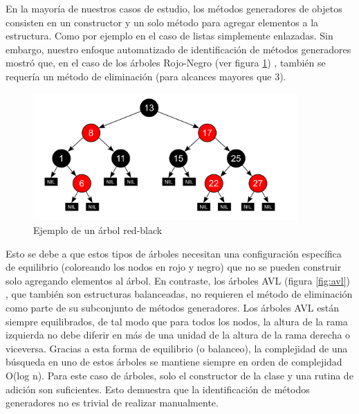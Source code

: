En la mayoría de nuestros casos de estudio, los métodos generadores de objetos consisten en un constructor y un solo método para agregar elementos a la estructura. 
Como por ejemplo en el caso de listas simplemente enlazadas. 
Sin embargo, nuestro enfoque automatizado de identificación de métodos generadores mostró que, 
en el caso de los árboles Rojo-Negro (ver figura \ref{fig:redBlack1}) , también se requería un método de eliminación (para alcances mayores que 3). 

\begin{figure}
  \centering
  \includegraphics[width=0.9\textwidth]{images/redBlackTree.jpg}
  \caption{Ejemplo de un árbol red-black}
  \label{fig:redBlack1}
\end{figure}

Esto se debe a que estos tipos de árboles necesitan una configuración específica de equilibrio (coloreando los nodos en rojo y negro) 
que no se pueden construir solo agregando elementos al árbol. En contraste, los
árboles AVL (figura \ref{fig:avl}) , 
que también son estructuras balanceadas, no requieren el método de eliminación como parte de su subconjunto de métodos generadores.
Los árboles AVL están siempre equilibrados, 
de tal modo que para todos los nodos, la altura de la rama izquierda no debe diferir en más de una unidad de la altura de la rama derecha o viceversa. 
Gracias a esta forma de equilibrio (o balanceo), la complejidad de una búsqueda en uno de estos árboles se mantiene siempre en orden de complejidad O(log n). 
Para este caso de árboles, solo el constructor de la clase y una rutina de adición son suficientes. 
Esto demuestra que la identificación de métodos generadores no es trivial de realizar manualmente.

